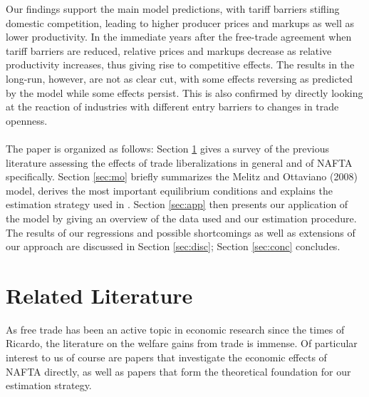 \documentclass[a4paper,12pt]{article}
\begin{document}
Our findings support the main model predictions, with tariff barriers stifling domestic competition, leading to higher producer prices and markups as well as lower productivity. In the immediate years after the free-trade agreement when tariff barriers are reduced, relative prices and markups decrease as relative productivity increases, thus giving rise to competitive effects. The results in the long-run, however, are not as clear cut, with some effects reversing as predicted by the model while some effects persist. This is also confirmed by directly looking at the reaction of industries with different entry barriers to changes in trade openness. \\
\vspace{0.5cm} \\
The paper is organized as follows: Section \ref{sec:lit} gives a survey of the previous literature assessing the effects of trade liberalizations in general and of NAFTA specifically. Section \ref{sec:mo} briefly summarizes the Melitz and Ottaviano (2008) model, derives the most important equilibrium conditions and explains the estimation strategy used in \citet{Chen2009}. Section \ref{sec:app} then presents our application of the model by giving an overview of the data used and our estimation procedure. The results of our regressions and possible shortcomings as well as extensions of our approach are discussed in Section \ref{sec:disc}; Section \ref{sec:conc} concludes.

\newpage


\section{Related Literature}\label{sec:lit}

As free trade has been an active topic in economic research since the times of Ricardo, the literature on the welfare gains from trade is immense. Of particular interest to us of course are papers that investigate the economic effects of NAFTA directly, as well as papers that form the theoretical foundation for our estimation strategy.
\end{document}
